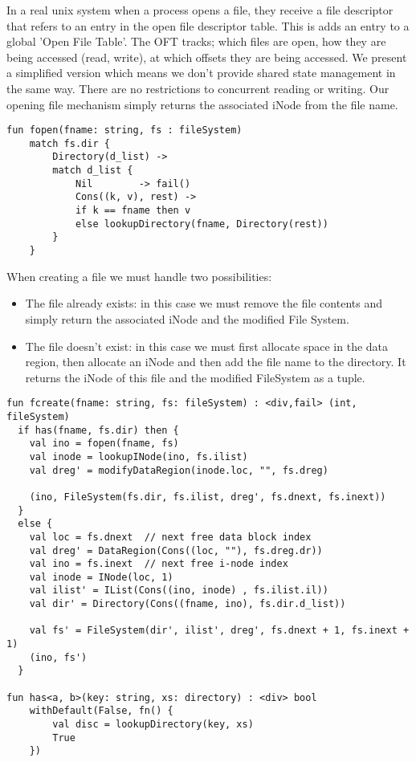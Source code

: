 \documentclass[logo,bsc,singlespacing,parskip]{infthesis}
\begin{document}
In a real unix system when a process opens a file, they receive a file descriptor that refers to an entry in the open file descriptor table. This is adds an entry to a global 'Open File Table'. The OFT tracks; which files are open, how they are being accessed (read, write), at which offsets they are being accessed. We present a simplified version which means we don't provide shared state management in the same way. There are no restrictions to concurrent reading or writing. Our opening file mechanism simply returns the associated iNode from the file name.

\begin{lstlisting}
fun fopen(fname: string, fs : fileSystem) 
    match fs.dir {
        Directory(d_list) ->
        match d_list {
            Nil        -> fail()  
            Cons((k, v), rest) ->
            if k == fname then v
            else lookupDirectory(fname, Directory(rest))
        }
    }
\end{lstlisting}    


When creating a file we must handle two possibilities:
\begin{itemize}
    \item The file already exists: in this case we must remove the file contents and simply return the associated  iNode and the modified File System.
    \item The file doesn't exist: in this case we must first allocate space in the data region, then allocate an iNode and then add the file name to the directory. It returns the iNode of this file and the modified FileSystem as a tuple.
\end{itemize}

\begin{lstlisting}
fun fcreate(fname: string, fs: fileSystem) : <div,fail> (int, fileSystem) 
  if has(fname, fs.dir) then {
    val ino = fopen(fname, fs)  
    val inode = lookupINode(ino, fs.ilist)  
    val dreg' = modifyDataRegion(inode.loc, "", fs.dreg)  

    (ino, FileSystem(fs.dir, fs.ilist, dreg', fs.dnext, fs.inext))  
  }
  else {
    val loc = fs.dnext  // next free data block index
    val dreg' = DataRegion(Cons((loc, ""), fs.dreg.dr))  
    val ino = fs.inext  // next free i-node index
    val inode = INode(loc, 1)  
    val ilist' = IList(Cons((ino, inode) , fs.ilist.il))  
    val dir' = Directory(Cons((fname, ino), fs.dir.d_list))
    
    val fs' = FileSystem(dir', ilist', dreg', fs.dnext + 1, fs.inext + 1)  
    (ino, fs')
  }

fun has<a, b>(key: string, xs: directory) : <div> bool
    withDefault(False, fn() {
        val disc = lookupDirectory(key, xs)  
        True  
    })
\end{lstlisting}
\end{document}
